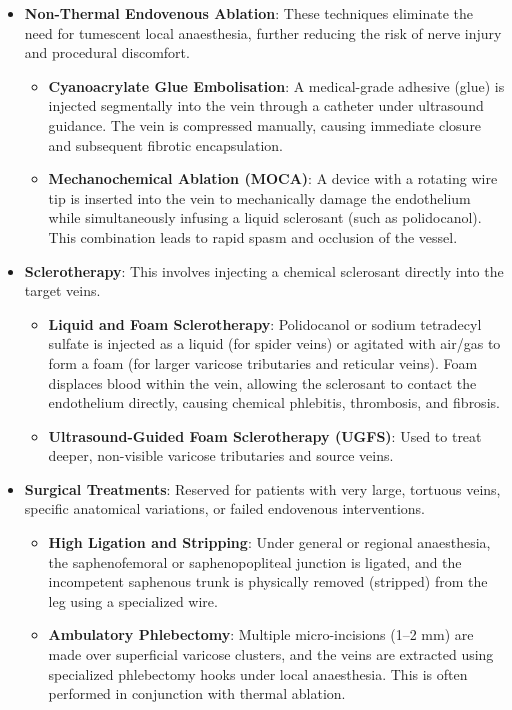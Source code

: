 \begin{itemize}
\begin{itemize}
    \item \textbf{Tumescent Anaesthesia}: A mixture of dilute local anaesthetic (lidocaine) and epinephrine is injected into the perivenous space. This protects surrounding nerves and tissues from heat damage, compresses the vein to ensure contact with the catheter, and provides intraoperative and postoperative analgesia.
    \end{itemize}
\item \textbf{Non-Thermal Endovenous Ablation}: These techniques eliminate the need for tumescent local anaesthesia, further reducing the risk of nerve injury and procedural discomfort.
    \begin{itemize}
    \item \textbf{Cyanoacrylate Glue Embolisation}: A medical-grade adhesive (glue) is injected segmentally into the vein through a catheter under ultrasound guidance. The vein is compressed manually, causing immediate closure and subsequent fibrotic encapsulation.
    \item \textbf{Mechanochemical Ablation (MOCA)}: A device with a rotating wire tip is inserted into the vein to mechanically damage the endothelium while simultaneously infusing a liquid sclerosant (such as polidocanol). This combination leads to rapid spasm and occlusion of the vessel.
    \end{itemize}
\item \textbf{Sclerotherapy}: This involves injecting a chemical sclerosant directly into the target veins.
    \begin{itemize}
    \item \textbf{Liquid and Foam Sclerotherapy}: Polidocanol or sodium tetradecyl sulfate is injected as a liquid (for spider veins) or agitated with air/gas to form a foam (for larger varicose tributaries and reticular veins). Foam displaces blood within the vein, allowing the sclerosant to contact the endothelium directly, causing chemical phlebitis, thrombosis, and fibrosis.
    \item \textbf{Ultrasound-Guided Foam Sclerotherapy (UGFS)}: Used to treat deeper, non-visible varicose tributaries and source veins.
    \end{itemize}
\item \textbf{Surgical Treatments}: Reserved for patients with very large, tortuous veins, specific anatomical variations, or failed endovenous interventions.
    \begin{itemize}
    \item \textbf{High Ligation and Stripping}: Under general or regional anaesthesia, the saphenofemoral or saphenopopliteal junction is ligated, and the incompetent saphenous trunk is physically removed (stripped) from the leg using a specialized wire.
    \item \textbf{Ambulatory Phlebectomy}: Multiple micro-incisions (1--2 mm) are made over superficial varicose clusters, and the veins are extracted using specialized phlebectomy hooks under local anaesthesia. This is often performed in conjunction with thermal ablation.
    \end{itemize}
\end{itemize}

